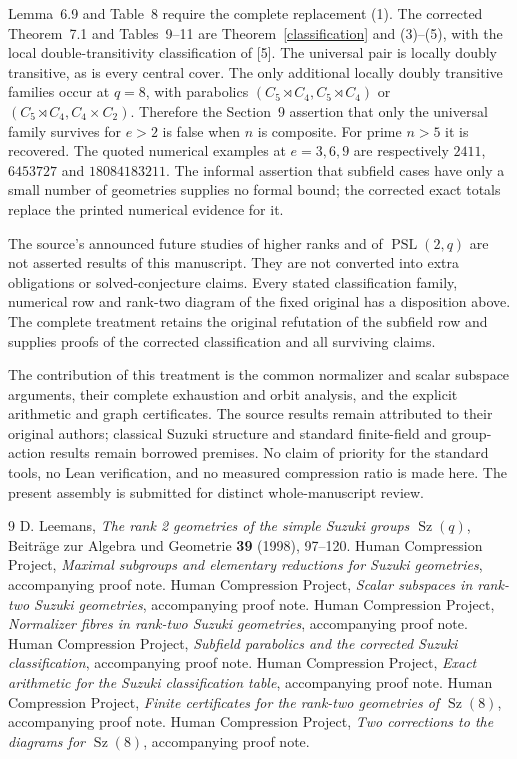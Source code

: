 \documentclass[11pt]{article}
\newcommand{\Sz}{\operatorname{Sz}}
\begin{document}
Lemma~6.9 and Table~8 require the complete replacement (1). The corrected
Theorem~7.1 and Tables~9--11 are Theorem~\ref{classification} and
(3)--(5), with the local double-transitivity classification of [5].
The universal pair is locally doubly transitive, as is every central
cover. The only additional locally doubly transitive families occur at
$q=8$, with parabolics $(C_5\rtimes C_4,C_5\rtimes C_4)$ or
$(C_5\rtimes C_4,C_4\times C_2)$. Therefore the Section~9 assertion that
only the universal family survives for $e>2$ is false when $n$ is
composite. For prime $n>5$ it is recovered. The quoted numerical examples
at $e=3,6,9$ are respectively $2411$, $6453727$ and $18084183211$.
The informal assertion that subfield cases have only a small number of
geometries supplies no formal bound; the corrected exact totals replace
the printed numerical evidence for it.

The source's announced future studies of higher ranks and of
$\operatorname{PSL}(2,q)$ are not asserted results of this manuscript.
They are not converted into extra obligations or solved-conjecture claims.
Every stated classification family, numerical row and rank-two diagram
of the fixed original has a disposition above. The complete treatment
retains the original refutation of the subfield row and supplies proofs
of the corrected classification and all surviving claims.

The contribution of this treatment is the common normalizer and scalar
subspace arguments, their complete exhaustion and orbit analysis, and the
explicit arithmetic and graph certificates. The source results remain
attributed to their original authors; classical Suzuki structure and
standard finite-field and group-action results remain borrowed premises.
No claim of priority for the standard tools, no Lean verification, and no
measured compression ratio is made here. The present assembly is submitted
for distinct whole-manuscript review.

\begin{thebibliography}{9}
 D. Leemans, \emph{The rank 2 geometries of the simple Suzuki
groups $\Sz(q)$}, Beitr\"age zur Algebra und Geometrie \textbf{39} (1998),
97--120.
 Human Compression Project, \emph{Maximal subgroups and elementary reductions
for Suzuki geometries}, accompanying proof note.
 Human Compression Project, \emph{Scalar subspaces in rank-two Suzuki
geometries}, accompanying proof note.
 Human Compression Project, \emph{Normalizer fibres in
rank-two Suzuki geometries}, accompanying proof note.
 Human Compression Project, \emph{Subfield parabolics and
the corrected Suzuki classification}, accompanying proof note.
 Human Compression Project, \emph{Exact arithmetic for the
Suzuki classification table}, accompanying proof note.
 Human Compression Project, \emph{Finite certificates for
the rank-two geometries of $\Sz(8)$}, accompanying proof note.
 Human Compression Project, \emph{Two corrections to the diagrams for $\Sz(8)$}, accompanying proof note.
\end{thebibliography}
\end{document}
